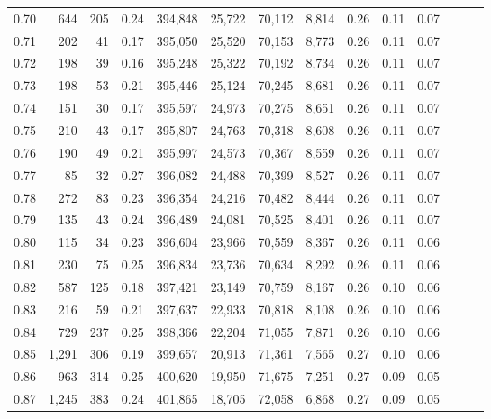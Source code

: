 \begin{tabular}{rrrrrrrrrrrrrr}
0.70 &     644 &    205 &  0.24 &  394,848 &   25,722 &  70,112 &   8,814 &  0.26 &  0.11 &      0.07 \\
0.71 &     202 &     41 &  0.17 &  395,050 &   25,520 &  70,153 &   8,773 &  0.26 &  0.11 &      0.07 \\
0.72 &     198 &     39 &  0.16 &  395,248 &   25,322 &  70,192 &   8,734 &  0.26 &  0.11 &      0.07 \\
0.73 &     198 &     53 &  0.21 &  395,446 &   25,124 &  70,245 &   8,681 &  0.26 &  0.11 &      0.07 \\
0.74 &     151 &     30 &  0.17 &  395,597 &   24,973 &  70,275 &   8,651 &  0.26 &  0.11 &      0.07 \\
0.75 &     210 &     43 &  0.17 &  395,807 &   24,763 &  70,318 &   8,608 &  0.26 &  0.11 &      0.07 \\
0.76 &     190 &     49 &  0.21 &  395,997 &   24,573 &  70,367 &   8,559 &  0.26 &  0.11 &      0.07 \\
0.77 &      85 &     32 &  0.27 &  396,082 &   24,488 &  70,399 &   8,527 &  0.26 &  0.11 &      0.07 \\
0.78 &     272 &     83 &  0.23 &  396,354 &   24,216 &  70,482 &   8,444 &  0.26 &  0.11 &      0.07 \\
0.79 &     135 &     43 &  0.24 &  396,489 &   24,081 &  70,525 &   8,401 &  0.26 &  0.11 &      0.07 \\
0.80 &     115 &     34 &  0.23 &  396,604 &   23,966 &  70,559 &   8,367 &  0.26 &  0.11 &      0.06 \\
0.81 &     230 &     75 &  0.25 &  396,834 &   23,736 &  70,634 &   8,292 &  0.26 &  0.11 &      0.06 \\
0.82 &     587 &    125 &  0.18 &  397,421 &   23,149 &  70,759 &   8,167 &  0.26 &  0.10 &      0.06 \\
0.83 &     216 &     59 &  0.21 &  397,637 &   22,933 &  70,818 &   8,108 &  0.26 &  0.10 &      0.06 \\
0.84 &     729 &    237 &  0.25 &  398,366 &   22,204 &  71,055 &   7,871 &  0.26 &  0.10 &      0.06 \\
0.85 &   1,291 &    306 &  0.19 &  399,657 &   20,913 &  71,361 &   7,565 &  0.27 &  0.10 &      0.06 \\
0.86 &     963 &    314 &  0.25 &  400,620 &   19,950 &  71,675 &   7,251 &  0.27 &  0.09 &      0.05 \\
0.87 &   1,245 &    383 &  0.24 &  401,865 &   18,705 &  72,058 &   6,868 &  0.27 &  0.09 &      0.05 \\

\end{tabular}

